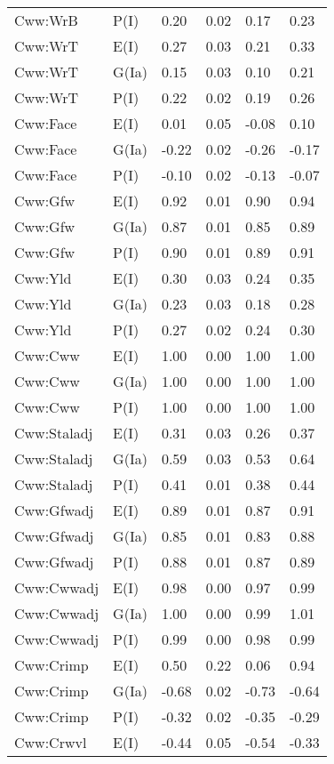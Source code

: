 \begin{center}
\begin{longtable}{|p{1.1in}|p{0.7in}|p{0.7in}|p{0.6in}|p{0.6in}|p{0.6in}|}
  Cww:WrB & P(I) & 0.20 & 0.02 & 0.17 & 0.23 \\ 
  Cww:WrT & E(I) & 0.27 & 0.03 & 0.21 & 0.33 \\ 
  Cww:WrT & G(Ia) & 0.15 & 0.03 & 0.10 & 0.21 \\ 
  Cww:WrT & P(I) & 0.22 & 0.02 & 0.19 & 0.26 \\ 
  Cww:Face & E(I) & 0.01 & 0.05 & -0.08 & 0.10 \\ 
  Cww:Face & G(Ia) & -0.22 & 0.02 & -0.26 & -0.17 \\ 
  Cww:Face & P(I) & -0.10 & 0.02 & -0.13 & -0.07 \\ 
  Cww:Gfw & E(I) & 0.92 & 0.01 & 0.90 & 0.94 \\ 
  Cww:Gfw & G(Ia) & 0.87 & 0.01 & 0.85 & 0.89 \\ 
  Cww:Gfw & P(I) & 0.90 & 0.01 & 0.89 & 0.91 \\ 
  Cww:Yld & E(I) & 0.30 & 0.03 & 0.24 & 0.35 \\ 
  Cww:Yld & G(Ia) & 0.23 & 0.03 & 0.18 & 0.28 \\ 
  Cww:Yld & P(I) & 0.27 & 0.02 & 0.24 & 0.30 \\ 
  Cww:Cww & E(I) & 1.00 & 0.00 & 1.00 & 1.00 \\ 
  Cww:Cww & G(Ia) & 1.00 & 0.00 & 1.00 & 1.00 \\ 
  Cww:Cww & P(I) & 1.00 & 0.00 & 1.00 & 1.00 \\ 
  Cww:Staladj & E(I) & 0.31 & 0.03 & 0.26 & 0.37 \\ 
  Cww:Staladj & G(Ia) & 0.59 & 0.03 & 0.53 & 0.64 \\ 
  Cww:Staladj & P(I) & 0.41 & 0.01 & 0.38 & 0.44 \\ 
  Cww:Gfwadj & E(I) & 0.89 & 0.01 & 0.87 & 0.91 \\ 
  Cww:Gfwadj & G(Ia) & 0.85 & 0.01 & 0.83 & 0.88 \\ 
  Cww:Gfwadj & P(I) & 0.88 & 0.01 & 0.87 & 0.89 \\ 
  Cww:Cwwadj & E(I) & 0.98 & 0.00 & 0.97 & 0.99 \\ 
  Cww:Cwwadj & G(Ia) & 1.00 & 0.00 & 0.99 & 1.01 \\ 
  Cww:Cwwadj & P(I) & 0.99 & 0.00 & 0.98 & 0.99 \\ 
  Cww:Crimp & E(I) & 0.50 & 0.22 & 0.06 & 0.94 \\ 
  Cww:Crimp & G(Ia) & -0.68 & 0.02 & -0.73 & -0.64 \\ 
  Cww:Crimp & P(I) & -0.32 & 0.02 & -0.35 & -0.29 \\ 
  Cww:Crwvl & E(I) & -0.44 & 0.05 & -0.54 & -0.33 \\ 

\end{longtable}
\end{center}
